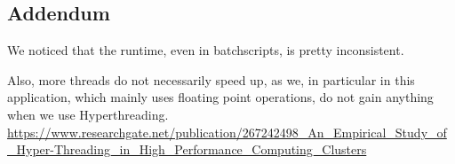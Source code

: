 \subsection*{Addendum}
We noticed that the runtime, even in batchscripts, is pretty inconsistent.
\iffalse
\begin{tikzpicture}
		\begin{axis}[
			legend style={cells={align=left}},
			xtick={8,16,32},
			xlabel=\#threads,
			ylabel=PAPI MFlop/s,
			title=Mflop/s for 8/16/32t for different runs at 5200 res,
			legend pos = outer north east,
			nodes near coords,
			scaled ticks = false,
			y tick label style={
        		/pgf/number format/.cd,
		            fixed,
        		    fixed zerofill,
		            precision=0,
        		/tikz/.cd
		    },
			no markers]
			\addplot[color=red] table {plots/run1_5200res_8-16-32.out};.
			\addplot[color=green] table {plots/run2_5200res_8-16-32.out};.
			\addplot[color=blue] table {plots/run3_5200res_8-16-32.out};.
			\legend{1st run, 2nd run, 3rd run}
		\end{axis}
	\end{tikzpicture}
\fi


Also, more threads do not necessarily speed up, as we, in particular in this application, which mainly uses floating point operations, do not gain anything when we use Hyperthreading. \url{https://www.researchgate.net/publication/267242498_An_Empirical_Study_of_Hyper-Threading_in_High_Performance_Computing_Clusters}

